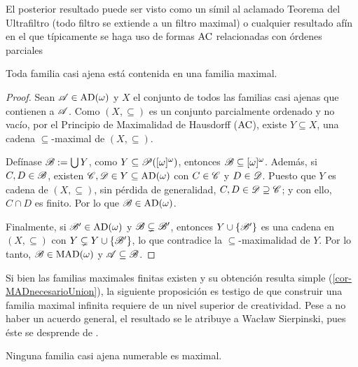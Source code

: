 El posterior resultado puede ser visto como un símil al aclamado Teorema del Ultrafiltro (todo filtro se extiende a un filtro maximal) o cualquier resultado afín en el que típicamente se haga uso de formas $\operatorname{AC}$ relacionadas con órdenes parciales

\begin{lema}\label{lem-MADs}
	Toda familia casi ajena está contenida en una familia maximal.
\end{lema}

\begin{proof}
	Sean $\mathscr{A} \in \operatorname{AD}(\omega)$ y $X$ el conjunto de todos las familias casi ajenas que contienen a $\mathscr{A}$. Como $(X,\subseteq)$ es un conjunto parcialmente ordenado y no vacío, por el Principio de Maximalidad de Hausdorff ($\operatorname{AC}$), existe $Y \subseteq X$, una cadena $\subseteq$-maximal de $(X,\subseteq)$.

	Defínase $\mathscr{B}:=\mbox{$\bigcup$}\, Y$, como $Y \subseteq \mathscr{P}([\omega]^\omega)$, entonces $\mathscr{B} \subseteq [\omega]^{\omega}$. Además, si $C,D \in \mathscr{B}$, existen $\mathscr{C},\mathscr{D} \in Y \subseteq \operatorname{AD}(\omega)$ con $C \in \mathscr{C}$ y $D\in \mathscr{D}$. Puesto que $Y$ es cadena de $(X,\subseteq)$, sin pérdida de generalidad, $C,D \in \mathscr{D} \supseteq \mathscr{C}$; y con ello, $C \cap D$ es finito. Por lo que $\mathscr{B} \in \operatorname{AD}(\omega)$.

	Finalmente, si $\mathscr{B}' \in \operatorname{AD}(\omega)$ y $\mathscr{B} \subsetneq \mathscr{B}'$, entonces $Y \cup \{\mathscr{B}'\}$ es una cadena en $(X,\subseteq)$ con $Y \subsetneq Y\cup\{\mathscr{B}'\}$, lo que contradice la $\subseteq$-maximalidad de $Y$. Por lo tanto, $\mathscr{B}\in \operatorname{MAD}(\omega)$ y $\mathscr{A} \subseteq \mathscr{B}$.
\end{proof}


Si bien las familias maximales finitas existen y su obtención resulta simple (\autoref{cor-MADnecesarioUnion}), la siguiente proposición es testigo de que construir una familia maximal infinita requiere de un nivel superior de creatividad. Pese a no haber un acuerdo general, el resultado se le atribuye a Wacław Sierpinski, pues éste se desprende de \cite[Teo.~2, p.~458]{SierpinskiCardinal}.

\begin{lema}\label{prop-MADnoNum}
	Ninguna familia casi ajena numerable es maximal.
\end{lema}


